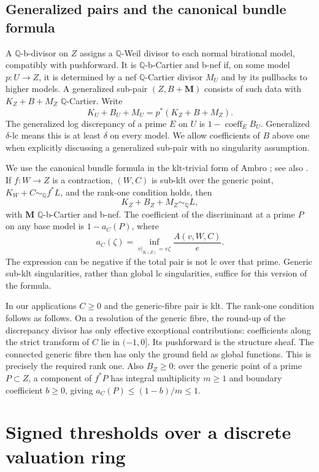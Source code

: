 \documentclass[11pt,reqno]{amsart}
\numberwithin{equation}{section}
\theoremstyle{definition}
\theoremstyle{remark}
\newcommand{\Q}{\mathbb Q}
\newcommand{\simq}{\sim_{\Q}}
\newcommand{\coef}{\operatorname{coeff}}
\newcommand{\bM}{\mathbf M}
\begin{document}
\subsection{Generalized pairs and the canonical bundle formula}
A $\Q$-b-divisor on $Z$ assigns a $\Q$-Weil divisor to each normal birational model, compatibly with pushforward. It is $\Q$-b-Cartier and b-nef if, on some model $p:U\to Z$, it is determined by a nef $\Q$-Cartier divisor $M_U$ and by its pullbacks to higher models. A generalized sub-pair $(Z,B+\bM)$ consists of such data with $K_Z+B+M_Z$ $\Q$-Cartier. Write
\[
 K_U+B_U+M_U=p^*(K_Z+B+M_Z).
\]
The generalized log discrepancy of a prime $E$ on $U$ is $1-\coef_E B_U$. Generalized $\delta$-lc means this is at least $\delta$ on every model. We allow coefficients of $B$ above one when explicitly discussing a generalized sub-pair with no singularity assumption.

We use the canonical bundle formula in the klt-trivial form of Ambro \cite[Theorem~2.7]{Amb04}; see also \cite[Definition~3.1 and Theorem~3.5]{FG14}. If $f:W\to Z$ is a contraction, $(W,C)$ is sub-klt over the generic point, $K_W+C\simq f^*L$, and the rank-one condition holds, then
\[
 K_Z+B_Z+M_Z\simq L,
\]
with $\bM$ $\Q$-b-Cartier and b-nef. The coefficient of the discriminant at a prime $P$ on any base model is $1-a_C(P)$, where
\begin{equation}\label{eq:discrdef}
 a_C(\zeta)=\inf_{v|_{K(Z)}=e\zeta}\frac{A(v,W,C)}{e}.
\end{equation}
The expression can be negative if the total pair is not lc over that prime. Generic sub-klt singularities, rather than global lc singularities, suffice for this version of the formula.

In our applications $C\ge0$ and the generic-fibre pair is klt. The rank-one condition follows as follows. On a resolution of the generic fibre, the round-up of the discrepancy divisor has only effective exceptional contributions: coefficients along the strict transform of $C$ lie in $(-1,0]$. Its pushforward is the structure sheaf. The connected generic fibre then has only the ground field as global functions. This is precisely the required rank one. Also $B_Z\ge0$: over the generic point of a prime $P\subset Z$, a component of $f^*P$ has integral multiplicity $m\ge1$ and boundary coefficient $b\ge0$, giving $a_C(P)\le(1-b)/m\le1$.

\section{Signed thresholds over a discrete valuation ring}\label{sec:local}
\end{document}

